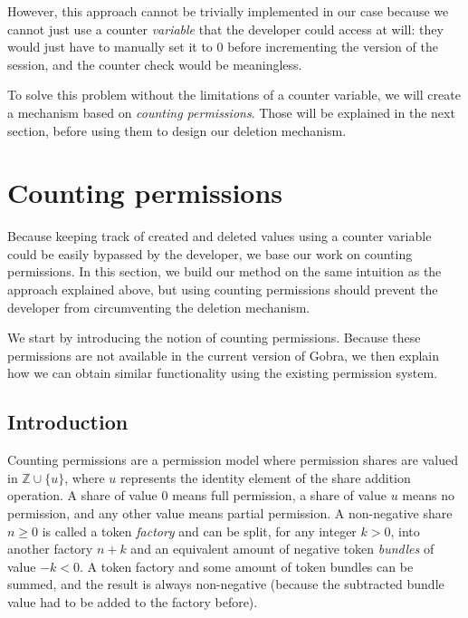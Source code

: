 However, this approach cannot be trivially implemented in our case because we cannot just use a counter \emph{variable} that the developer could access at will: they would just have to manually set it to $0$ before incrementing the version of the session, and the counter check would be meaningless.

To solve this problem without the limitations of a counter variable, we will create a mechanism based on \emph{counting permissions}. Those will be explained in the next section, before using them to design our deletion mechanism.

\section{Counting permissions}
\label{sec:counting-permissions}

Because keeping track of created and deleted values using a counter variable could be easily bypassed by the developer, we base our work on counting permissions.
In this section, we build our method on the same intuition as the approach explained above, but using counting permissions should prevent the developer from circumventing the deletion mechanism.

We start by introducing the notion of counting permissions.
Because these permissions are not available in the current version of Gobra, we then explain how we can obtain similar functionality using the existing permission system.

\subsection{Introduction}
\label{sec:counting-permissions-introduction}

Counting permissions are a permission model where permission shares are valued in $\mathbb{Z}\cup\{u\}$, where $u$ represents the identity element of the share addition operation. A share of value $0$ means full permission, a share of value $u$ means no permission, and any other value means partial permission. A non-negative share $n\geq0$ is called a token \emph{factory} and can be split, for any integer $k>0$, into another factory $n+k$ and an equivalent amount of negative token \emph{bundles} of value $-k<0$. A token factory and some amount of token bundles can be summed, and the result is always non-negative (because the subtracted bundle value had to be added to the factory before). 

